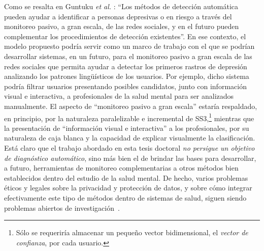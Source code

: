Como se resalta en Guntuku \emph{et al.} \cite{guntuku2017detecting}: ``Los métodos de detección automática pueden ayudar a identificar a personas depresivas o en riesgo a través del monitoreo pasivo, a gran escala, de las redes sociales, y en el futuro pueden complementar los procedimientos de detección existentes''.
En ese contexto, el modelo propuesto podría servir como un marco de trabajo con el que se podrían desarrollar sistemas, en un futuro, para el monitoreo pasivo a gran escala de las redes sociales que permita ayudar a detectar los primeros rastros de depresión analizando los patrones lingüísticos de los usuarios. Por ejemplo, dicho sistema podría filtrar usuarios presentando posibles candidatos, junto con información visual e interactiva, a profesionales de la salud mental para ser analizados manualmente. El aspecto de ``monitoreo pasivo a gran escala'' estaría respaldado, en principio, por la naturaleza paralelizable e incremental de SS3,\footnote{Sólo se requeriría almacenar un pequeño vector bidimensional, el \emph{vector de confianza}, por cada usuario.} mientras que la presentación de ``información visual e interactiva'' a los profesionales, por su naturaleza de caja blanca y la capacidad de explicar visualmente la clasificación.
Está claro que el trabajo abordado en esta tesis doctoral \emph{no persigue un objetivo de diagnóstico automático}, sino más bien el de brindar las bases para desarrollar, a futuro, herramientas de monitoreo complementarias a otros métodos bien establecidos dentro del estudio de la salud mental.
De hecho, varios problemas éticos y legales sobre la privacidad y protección de datos, y sobre cómo integrar efectivamente este tipo de métodos dentro de sistemas de salud, siguen siendo problemas abiertos de investigación~\cite{guntuku2017detecting}.

